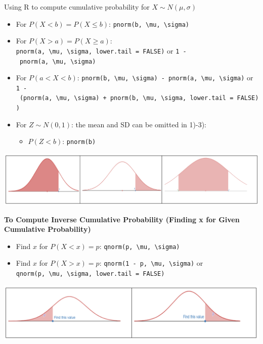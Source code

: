 \documentclass[
]{book}
\providecommand{\tightlist}{%
  \setlength{\itemsep}{0pt}\setlength{\parskip}{0pt}}
\begin{document}
Using R to compute cumulative probability for \(X \sim N(\mu, \sigma)\)

\begin{itemize}
\tightlist
\item
  For \(P(X < b) = P(X \leq b)\): \texttt{pnorm(b,\ \textbackslash{}mu,\ \textbackslash{}sigma)}
\item
  For \(P(X > a) = P(X \geq a)\): \texttt{pnorm(a,\ \textbackslash{}mu,\ \textbackslash{}sigma,\ lower.tail\ =\ FALSE)} or \texttt{1\ -\ pnorm(a,\ \textbackslash{}mu,\ \textbackslash{}sigma)}
\item
  For \(P(a < X < b)\): \texttt{pnorm(b,\ \textbackslash{}mu,\ \textbackslash{}sigma)\ -\ pnorm(a,\ \textbackslash{}mu,\ \textbackslash{}sigma)} or \texttt{1\ -\ (pnorm(a,\ \textbackslash{}mu,\ \textbackslash{}sigma)\ +\ pnorm(b,\ \textbackslash{}mu,\ \textbackslash{}sigma,\ lower.tail\ =\ FALSE))}
\item
  For \(Z \sim N(0, 1)\): the mean and SD can be omitted in 1)-3):

  \begin{itemize}
  \tightlist
  \item
    \(P(Z < b)\): \texttt{pnorm(b)}
  \end{itemize}
\end{itemize}

\includegraphics[width=5.72917in,height=\textheight]{images/img45.png}

\textbf{To Compute Inverse Cumulative Probability (Finding x for Given Cumulative Probability)}

\begin{itemize}
\tightlist
\item
  Find \(x\) for \(P(X < x) = p\): \texttt{qnorm(p,\ \textbackslash{}mu,\ \textbackslash{}sigma)}
\item
  Find \(x\) for \(P(X > x) = p\): \texttt{qnorm(1\ -\ p,\ \textbackslash{}mu,\ \textbackslash{}sigma)} or \texttt{qnorm(p,\ \textbackslash{}mu,\ \textbackslash{}sigma,\ lower.tail\ =\ FALSE)}
\end{itemize}

\includegraphics[width=5.72917in,height=\textheight]{images/img46.png}
\end{document}
